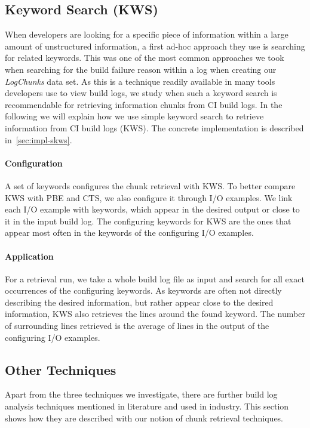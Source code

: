 \documentclass[\myrootdir/main.tex]{subfiles}
\begin{document}
\subsection{Keyword Search (KWS)}
\label{sec:expl-skws}
When developers are looking for a specific piece of information within a large amount of unstructured information, a first ad-hoc approach they use is searching for related keywords.
This was one of the most common approaches we took when searching for the build failure reason within a log when creating our \emph{LogChunks} data set.
As this is a technique readily available in many tools developers use to view build logs, we study when such a keyword search is recommendable for retrieving information chunks from CI build logs.
In the following we will explain how we use simple keyword search to retrieve information from CI build logs (KWS).
The concrete implementation is described in~\ref{sec:impl-skws}.

\paragraph{Configuration}
A set of keywords configures the chunk retrieval with KWS\@.
To better compare KWS with PBE and CTS, we also configure it through I/O examples.
We link each I/O example with keywords, which appear in the desired output or close to it in the input build log.
The configuring keywords for KWS are the ones that appear most often in the keywords of the configuring I/O examples.

\paragraph{Application}
For a retrieval run, we take a whole build log file as input and search for all exact occurrences of the configuring keywords.
As keywords are often not directly describing the desired information, but rather appear close to the desired information, KWS also retrieves the lines around the found keyword.
The number of surrounding lines retrieved is the average of lines in the output of the configuring I/O examples.

\subsection{Other Techniques}
\label{sec:expl-rlr}
Apart from the three techniques we investigate, there are further build log analysis techniques mentioned in literature and used in industry.
This section shows how they are described with our notion of chunk retrieval techniques.
\end{document}
